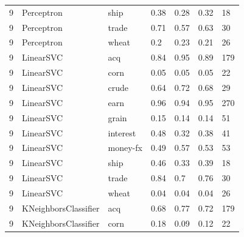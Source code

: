 \documentclass{article}
\begin{document}
\begin{table}[H]
\begin{tabular}{lllllll}
9             & Perceptron             & ship            & 0.38               & 0.28            & 0.32              & 18               \\
9             & Perceptron             & trade           & 0.71               & 0.57            & 0.63              & 30               \\
9             & Perceptron             & wheat           & 0.2                & 0.23            & 0.21              & 26               \\
9             & LinearSVC              & acq             & 0.84               & 0.95            & 0.89              & 179              \\
9             & LinearSVC              & corn            & 0.05               & 0.05            & 0.05              & 22               \\
9             & LinearSVC              & crude           & 0.64               & 0.72            & 0.68              & 29               \\
9             & LinearSVC              & earn            & 0.96               & 0.94            & 0.95              & 270              \\
9             & LinearSVC              & grain           & 0.15               & 0.14            & 0.14              & 51               \\
9             & LinearSVC              & interest        & 0.48               & 0.32            & 0.38              & 41               \\
9             & LinearSVC              & money-fx        & 0.49               & 0.57            & 0.53              & 53               \\
9             & LinearSVC              & ship            & 0.46               & 0.33            & 0.39              & 18               \\
9             & LinearSVC              & trade           & 0.84               & 0.7             & 0.76              & 30               \\
9             & LinearSVC              & wheat           & 0.04               & 0.04            & 0.04              & 26               \\
9             & KNeighborsClassifier   & acq             & 0.68               & 0.77            & 0.72              & 179              \\
9             & KNeighborsClassifier   & corn            & 0.18               & 0.09            & 0.12              & 22               \\

\end{tabular}
\end{table}
\end{document}
